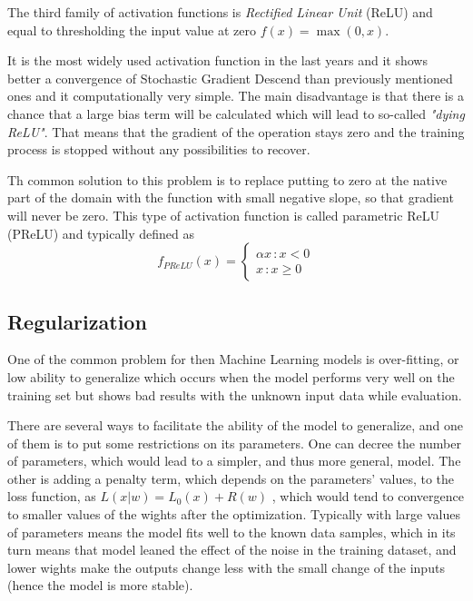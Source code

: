 The third family of activation functions is \textit{Rectified Linear Unit} (ReLU) and equal to thresholding the input value at zero $f(x)=\max(0,x)$. 

It is the most widely used activation function in the last years and it shows better a convergence of Stochastic Gradient Descend than previously mentioned ones and it computationally very simple.
The main disadvantage is that there is a chance that a large bias term will be calculated which will lead to so-called \textit{"dying ReLU"}. 
That means that the gradient of the operation stays zero and the training process is stopped without any possibilities to recover. 

Th common solution to this problem is to replace putting to zero at the native part of the domain with the function with small negative slope, so that gradient will never be zero. 
This type of activation function is called parametric ReLU (PReLU) and typically defined as  
\[ f_{PReLU}(x) = 
\begin{cases}
	\alpha x \, :x<0 \\
	x \, : x \geq 0
\end{cases}
\]

\subsection{Regularization}

One of the common problem for then Machine Learning models is over-fitting, or low ability to generalize which occurs when the model performs very well on the training set but shows bad results with the unknown input data while evaluation.


There are several ways to facilitate the ability of the model to generalize, and one of them is to put some restrictions on its parameters.
One can decree the number of parameters, which would lead to a simpler, and thus more general, model.
The other is adding a penalty term, which depends on the parameters' values, to the loss function, as $L(x|w) = L_{0}(x) + R(w)$ , which would tend to convergence to smaller values of the wights after the optimization. 
Typically with large values of parameters means the model fits well to the known data samples, which in its turn means that model leaned the effect of the noise in the training dataset, and lower wights make the outputs change less with the small change of the inputs (hence the model is more stable).


